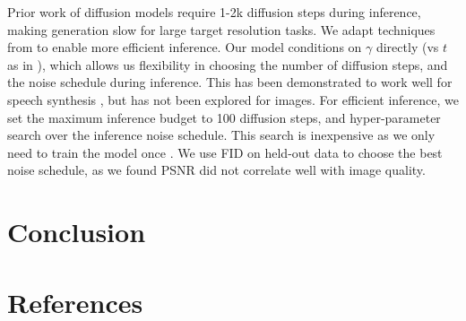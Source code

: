 \documentclass{article}
\begin{document}
Prior work of diffusion models \cite{ref17, ref51} require 1-2k diffusion steps during inference, making generation slow for large target resolution tasks. We adapt techniques from \cite{ref6} to enable more efficient inference. Our model conditions on $\gamma$ directly (vs $t$ as in \cite{ref17}), which allows us flexibility in choosing the number of diffusion steps, and the noise schedule during inference. This has been demonstrated to work well for speech synthesis \cite{ref6}, but has not been explored for images. For efficient inference, we set the maximum inference budget to 100 diffusion steps, and hyper-parameter search over the inference noise schedule. This search is inexpensive as we only need to train the model once \cite{ref6}. We use FID on held-out data to choose the best noise schedule, as we found PSNR did not correlate well with image quality.

\section{Conclusion}



\section*{References}
\end{document}

